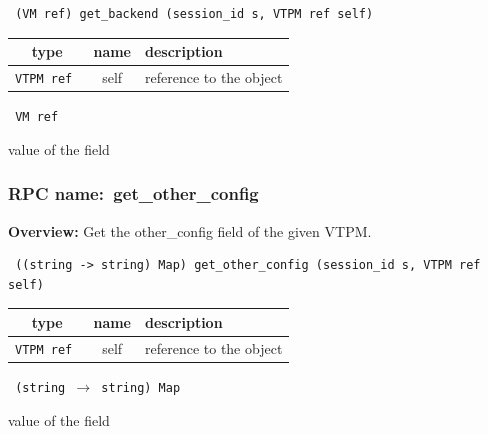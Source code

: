 \begin{verbatim} (VM ref) get_backend (session_id s, VTPM ref self)\end{verbatim}



 
\vspace{0.3cm}
\begin{tabular}{|c|c|p{7cm}|}
 \hline
{\bf type} & {\bf name} & {\bf description} \\ \hline
{\tt VTPM ref } & self & reference to the object \\ \hline 

\end{tabular}

\vspace{0.3cm}

{\tt 
VM ref
}


value of the field
\vspace{0.3cm}
\vspace{0.3cm}
\vspace{0.3cm}
\subsubsection{RPC name:~get\_other\_config}

{\bf Overview:}
Get the other\_config field of the given VTPM.

\begin{verbatim} ((string -> string) Map) get_other_config (session_id s, VTPM ref self)\end{verbatim}




\vspace{0.3cm}
\begin{tabular}{|c|c|p{7cm}|}
 \hline
{\bf type} & {\bf name} & {\bf description} \\ \hline
{\tt VTPM ref } & self & reference to the object \\ \hline

\end{tabular}

\vspace{0.3cm}

{\tt
(string $\rightarrow$ string) Map
}


value of the field
\vspace{0.3cm}
\vspace{0.3cm}
\vspace{0.3cm}
